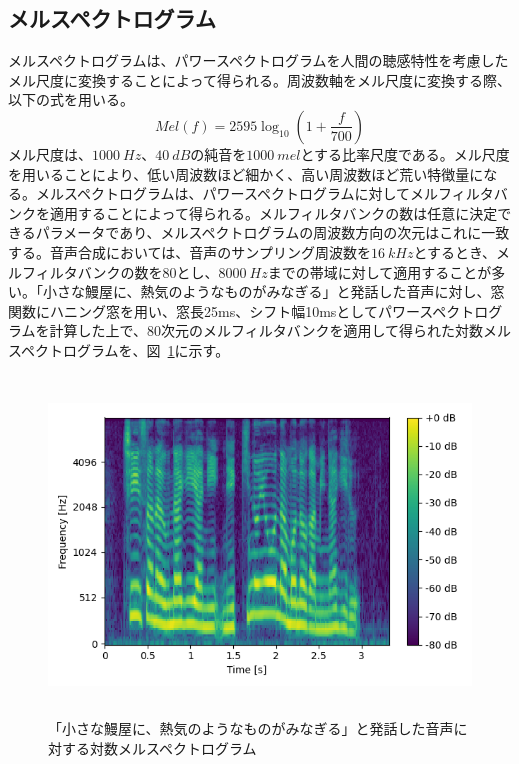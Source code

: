 \documentclass[12pt]{jarticle}
\numberwithin{equation}{section}    %
\numberwithin{figure}{section}      %
\numberwithin{table}{section}      %
\begin{document}
\subsection{メルスペクトログラム}
メルスペクトログラムは、パワースペクトログラムを人間の聴感特性を考慮したメル尺度に変換することによって得られる。周波数軸をメル尺度に変換する際、以下の式を用いる。
\begin{equation}
    Mel(f) = 2595\log_{10} \left(1 + \frac{f}{700}\right)
\end{equation}
メル尺度は、$\SI[]{1000}{Hz}$、$\SI[]{40}{dB}$の純音を$\SI[]{1000}{mel}$とする比率尺度である。メル尺度を用いることにより、低い周波数ほど細かく、高い周波数ほど荒い特徴量になる。メルスペクトログラムは、パワースペクトログラムに対してメルフィルタバンクを適用することによって得られる。メルフィルタバンクの数は任意に決定できるパラメータであり、メルスペクトログラムの周波数方向の次元はこれに一致する。音声合成においては、音声のサンプリング周波数を$\SI[]{16}{kHz}$とするとき、メルフィルタバンクの数を80とし、$\SI[]{8000}{Hz}$までの帯域に対して適用することが多い。「小さな鰻屋に、熱気のようなものがみなぎる」と発話した音声に対し、窓関数にハニング窓を用い、窓長25ms、シフト幅10msとしてパワースペクトログラムを計算した上で、80次元のメルフィルタバンクを適用して得られた対数メルスペクトログラムを、図~\ref{sec2:fig:melspectrogram}に示す。
\begin{figure}[bt]
    \centering
    \includegraphics[height=90mm]{./figure/sec2/melspectrogram.png}
    \caption{「小さな鰻屋に、熱気のようなものがみなぎる」と発話した音声に対する対数メルスペクトログラム}
    \label{sec2:fig:melspectrogram}
\end{figure}

\clearpage
\end{document}

